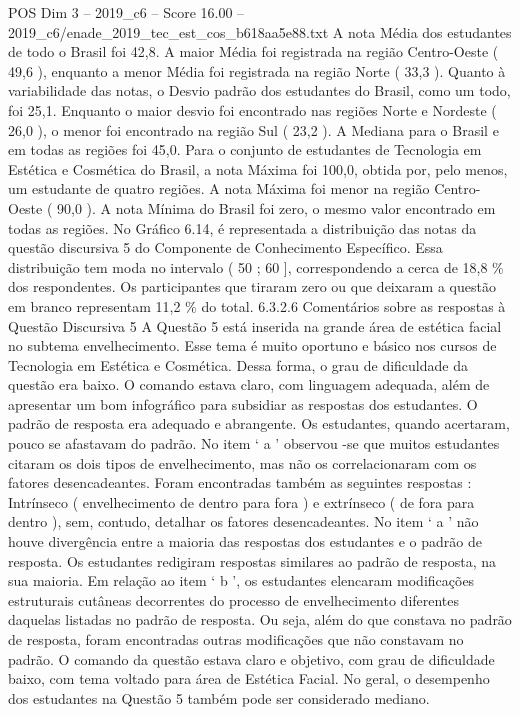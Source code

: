 \begin{textsample}{POS Dim 3 – 2019\_c6 – Score 16.00 – 2019\_c6/enade\_2019\_tec\_est\_cos\_b618aa5e88.txt}
A nota Média dos estudantes de todo o Brasil foi 42,8.
A maior Média foi registrada na região Centro-Oeste ( 49,6 ), enquanto a menor Média foi registrada na região Norte ( 33,3 ).
Quanto à variabilidade das notas, o Desvio padrão dos estudantes do Brasil, como um todo, foi 25,1.
Enquanto o maior desvio foi encontrado nas regiões Norte e Nordeste ( 26,0 ), o menor foi encontrado na região Sul ( 23,2 ).
A Mediana para o Brasil e em todas as regiões foi 45,0.
Para o conjunto de estudantes de Tecnologia em Estética e Cosmética do Brasil, a nota Máxima foi 100,0, obtida por, pelo menos, um estudante de quatro regiões.
A nota Máxima foi menor na região Centro-Oeste ( 90,0 ).
A nota Mínima do Brasil foi zero, o mesmo valor encontrado em todas as regiões.
No Gráfico 6.14, é representada a distribuição das notas da questão discursiva 5 do Componente de Conhecimento Específico.
Essa distribuição tem moda no intervalo ( 50 ; 60 ], correspondendo a cerca de 18,8 \% dos respondentes.
Os participantes que tiraram zero ou que deixaram a questão em branco representam 11,2 \% do total. 6.3.2.6 Comentários sobre as respostas à Questão Discursiva 5 A Questão 5 está inserida na grande área de estética facial no subtema envelhecimento.
Esse tema é muito oportuno e básico nos cursos de Tecnologia em Estética e Cosmética.
Dessa forma, o grau de dificuldade da questão era baixo.
O comando estava claro, com linguagem adequada, além de apresentar um bom infográfico para subsidiar as respostas dos estudantes.
O padrão de resposta era adequado e abrangente.
Os estudantes, quando acertaram, pouco se afastavam do padrão.
No item ‘ a ’ observou -se que muitos estudantes citaram os dois tipos de envelhecimento, mas não os correlacionaram com os fatores desencadeantes.
Foram encontradas também as seguintes respostas : Intrínseco ( envelhecimento de dentro para fora ) e extrínseco ( de fora para dentro ), sem, contudo, detalhar os fatores desencadeantes.
No item ‘ a ’ não houve divergência entre a maioria das respostas dos estudantes e o padrão de resposta.
Os estudantes redigiram respostas similares ao padrão de resposta, na sua maioria.
Em relação ao item ‘ b ’, os estudantes elencaram modificações estruturais cutâneas decorrentes do processo de envelhecimento diferentes daquelas listadas no padrão de resposta.
Ou seja, além do que constava no padrão de resposta, foram encontradas outras modificações que não constavam no padrão.
O comando da questão estava claro e objetivo, com grau de dificuldade baixo, com tema voltado para área de Estética Facial.
No geral, o desempenho dos estudantes na Questão 5 também pode ser considerado mediano.

\end{textsample}
